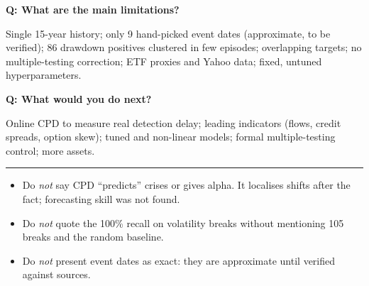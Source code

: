 \documentclass[10pt]{article}
\newcommand{\h}[1]{\vspace{4pt}{\large\bfseries #1}\par\vspace{1pt}\hrule\vspace{3pt}}
\newcommand{\q}[1]{\par\vspace{2pt}\textbf{Q: #1}\par\vspace{-3pt}}
\begin{document}
\q{What are the main limitations?}
Single 15-year history; only 9 hand-picked event dates (approximate, to be verified); 86 drawdown positives clustered in few episodes; overlapping targets; no multiple-testing correction; ETF proxies and Yahoo data; fixed, untuned hyperparameters.

\q{What would you do next?}
Online CPD to measure real detection delay; leading indicators (flows, credit spreads, option skew); tuned and non-linear models; formal multiple-testing control; more assets.

\h{8. Do-not-say list (avoid these claims)}
\begin{itemize}
\item Do \emph{not} say CPD ``predicts'' crises or gives alpha. It localises shifts after the fact; forecasting skill was not found.
\item Do \emph{not} quote the 100\% recall on volatility breaks without mentioning 105 breaks and the random baseline.
\item Do \emph{not} present event dates as exact: they are approximate until verified against sources.
\end{itemize}
\end{document}
